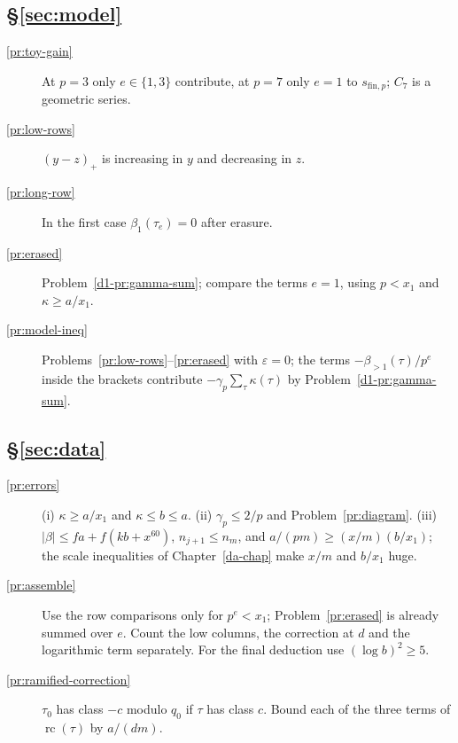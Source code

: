 \documentclass[reqno]{amsart}
\newcounter{chap}
\theoremstyle{plain}
\theoremstyle{definition}
\theoremstyle{remark}
\newcommand{\sfp}{s_{\mathrm{fin},p}}
\newcommand{\bo}{\beta_1}
\newcommand{\bl}{\beta_{>1}}
\begin{document}
\subsection*{\S\ref{sec:model}}
\begin{description}
\item[\ref{pr:toy-gain}] At \(p = 3\) only \(e \in \{1, 3\}\) contribute, at \(p = 7\) only \(e = 1\) to \(\sfp\); \(C_7\) is a geometric series.
\item[\ref{pr:low-rows}] \((y - z)_+\) is increasing in \(y\) and decreasing in \(z\).
\item[\ref{pr:long-row}] In the first case \(\bo(\tau_e) = 0\) after erasure.
\item[\ref{pr:erased}] Problem~\ref{d1-pr:gamma-sum}; compare the terms \(e = 1\), using \(p < x_1\) and \(\kappa \ge a/x_1\).
\item[\ref{pr:model-ineq}] Problems~\ref{pr:low-rows}--\ref{pr:erased} with \(\varepsilon = 0\); the terms \(-\bl(\tau)/p^e\) inside the brackets contribute \(-\gamma_p \sum_\tau \kappa(\tau)\) by Problem~\ref{d1-pr:gamma-sum}.
\end{description}

\subsection*{\S\ref{sec:data}}
\begin{description}
\item[\ref{pr:errors}] (i) \(\kappa \ge a/x_1\) and \(\kappa \le b \le a\).  (ii) \(\gamma_p \le 2/p\) and Problem~\ref{pr:diagram}.  (iii) \(\lvert\beta\rvert \le fa + f(kb + x^{60})\), \(n_{j+1} \le n_m\), and \(a/(pm) \ge (x/m)(b/x_1)\); the scale inequalities of Chapter~\ref{da-chap} make \(x/m\) and \(b/x_1\) huge.
\item[\ref{pr:assemble}] Use the row comparisons only for \(p^e < x_1\); Problem~\ref{pr:erased} is already summed over \(e\).  Count the low columns, the correction at \(d\) and the logarithmic term separately.  For the final deduction use \((\log b)^2 \ge 5\).
\item[\ref{pr:ramified-correction}] \(\tau_0\) has class \(-c\) modulo \(q_0\) if \(\tau\) has class \(c\).  Bound each of the three terms of \(\operatorname{rc}(\tau)\) by \(a/(dm)\).
\end{description}
\end{document}
